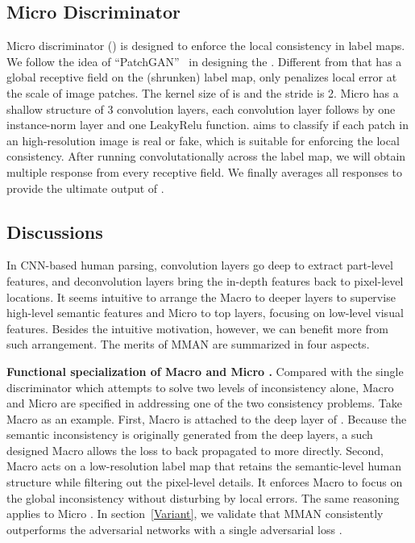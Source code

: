 \documentclass[runningheads]{llncs}
\begin{document}
\subsection{Micro Discriminator} \label{sec:mi}
Micro discriminator () is designed to enforce the local consistency in label maps. We follow the idea of ``PatchGAN''~\cite{isola2017image} in designing the . Different from  that has a global receptive field on the (shrunken) label map,  only penalizes local error at the scale of image patches. The kernel size of  is  and the stride is 2. Micro  has a shallow structure of 3 convolution layers, each convolution layer follows by one instance-norm layer and one LeakyRelu function.  aims to classify if each  patch in an high-resolution image is real or fake, which is suitable for enforcing the local consistency. After running  convolutationally across the label map, we will obtain multiple response from every receptive field. We finally averages all responses to provide the ultimate output of .

\subsection{Discussions}\label{sec:merits}
In CNN-based human parsing, convolution layers go deep to extract part-level features, and deconvolution layers bring the in-depth features back to pixel-level locations. It seems intuitive to arrange the Macro  to deeper layers to supervise high-level semantic features and Micro  to top layers, focusing on low-level visual features. Besides the intuitive motivation, however, we can benefit more from such arrangement. The merits of MMAN are summarized in four aspects.

\textbf{Functional specialization of Macro  and Micro .} Compared with the single discriminator which attempts to solve two levels of inconsistency alone, Macro  and Micro  are specified in addressing one of the two consistency problems. Take Macro  as an example. First, Macro  is attached to the deep layer of . Because the semantic inconsistency is originally generated from the deep layers, a such designed Macro  allows the loss to back propagated to  more directly. Second, Macro  acts on a low-resolution label map that retains the semantic-level human structure while filtering out the pixel-level details. It enforces Macro  to focus on the global inconsistency without disturbing by local errors. The same reasoning applies to Micro . In section~\ref{Variant}, we validate that MMAN consistently outperforms the adversarial networks with a single adversarial loss \cite{luc2016semantic,dai2017scan}.
\end{document}
